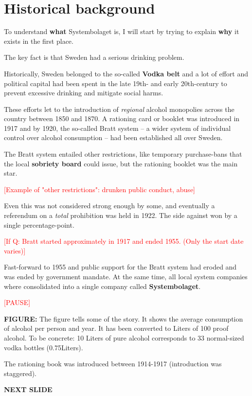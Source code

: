 \documentclass[12pt]{article}
\newcommand{\TODO}[1]{\textcolor{red}{[#1]}}
\begin{document}
\section{Historical background}

To understand  \textbf{what}  Systembolaget is, I will start by trying to explain  \textbf{why}  it exists in the first place. 

The key fact is that Sweden had a serious drinking problem. 

Historically, Sweden belonged to the so-called \textbf{Vodka belt} and a lot of effort and political capital had been spent in the late 19th- and early 20th-century to prevent excessive drinking and mitigate social harms.

These efforts let to the introduction of \emph{regional}  alcohol monopolies across the country between 1850 and 1870. A rationing card or booklet was introduced in 1917 and by 1920, the so-called Bratt system -- a wider system of individual control over alcohol consumption -- had been established all over Sweden. 

The Bratt system entailed other restrictions, like temporary purchase-bans that the local  \textbf{sobriety board}  could issue, but the rationing booklet was the main star.

\TODO{Example of "other restrictions": drunken public conduct, abuse}

Even this was not considered strong enough by some, and eventually a referendum on a \emph{total}  prohibition was held in 1922. The side against won by a single percentage-point.

\TODO{If Q: Bratt started approximately in 1917 and ended 1955. (Only the start date varies)}

Fast-forward to 1955 and public support for the Bratt system had eroded and was ended by government mandate. At the same time, all local system companies where consolidated into a single company called  \textbf{Systembolaget}.

\TODO{PAUSE}

 \textbf{FIGURE:} The figure tells some of the story. It shows the average consumption of alcohol per person and year. It has been converted to Liters of 100 proof alcohol. To be concrete: 10 Liters of pure alcohol corresponds to 33 normal-sized vodka bottles (0.75Liters).

The rationing book was introduced between 1914-1917 (introduction was staggered).

\textbf{NEXT SLIDE}
\end{document}
